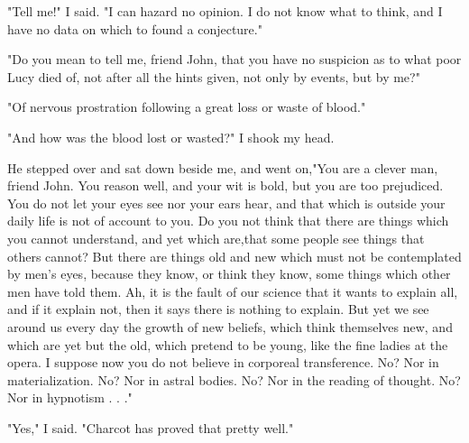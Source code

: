 "Tell me!" I said. "I can hazard no opinion. I do not know what to think, and I have no data on which to found a conjecture." 

"Do you mean to tell me, friend John, that you have no suspicion as to what poor Lucy died of, not after all the hints given, not only by events, but by me?" 

"Of nervous prostration following a great loss or waste of blood." 

"And how was the blood lost or wasted?" I shook my head. 

He stepped over and sat down beside me, and went on,"You are a clever man, friend John. You reason well, and your wit is bold, but you are too prejudiced. You do not let your eyes see nor your ears hear, and that which is outside your daily life is not of account to you. Do you not think that there are things which you cannot understand, and yet which are,that some people see things that others cannot? But there are things old and new which must not be contemplated by men's eyes, because they know, or think they know, some things which other men have told them. Ah, it is the fault of our science that it wants to explain all, and if it explain not, then it says there is nothing to explain. But yet we see around us every day the growth of new beliefs, which think themselves new, and which are yet but the old, which pretend to be young, like the fine ladies at the opera. I suppose now you do not believe in corporeal transference. No? Nor in materialization. No? Nor in astral bodies. No? Nor in the reading of thought. No? Nor in hypnotism . . ." 

"Yes," I said. "Charcot has proved that pretty well." 

